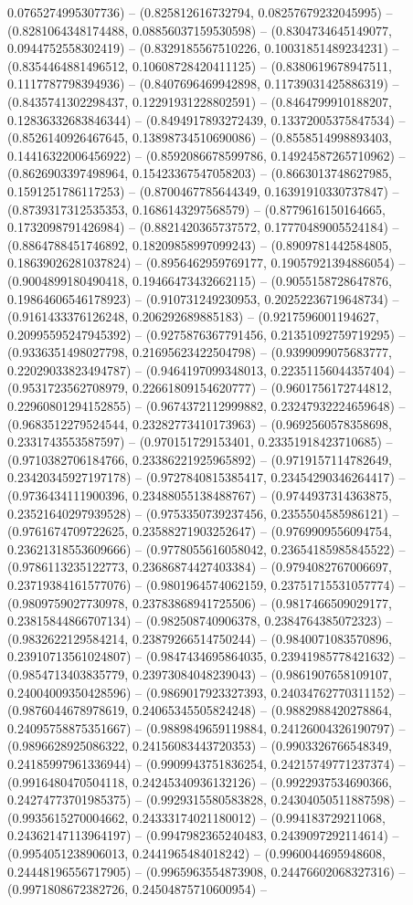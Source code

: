 0.0765274995307736) -- (0.825812616732794, 0.08257679232045995) -- (0.8281064348174488, 0.08856037159530598) -- (0.8304734645149077, 0.0944752558302419) -- (0.8329185567510226, 0.10031851489234231) -- (0.8354464881496512, 0.10608728420411125) -- (0.8380619678947511, 0.1117787798394936) -- (0.8407696469942898, 0.11739031425886319) -- (0.8435741302298437, 0.12291931228802591) -- (0.8464799910188207, 0.12836332683846344) -- (0.8494917893272439, 0.13372005375847534) -- (0.8526140926467645, 0.13898734510690086) -- (0.8558514998893403, 0.14416322006456922) -- (0.8592086678599786, 0.14924587265710962) -- (0.8626903397498964, 0.15423367547058203) -- (0.8663013748627985, 0.1591251786117253) -- (0.8700467785644349, 0.16391910330737847) -- (0.8739317312535353, 0.1686143297568579) -- (0.8779616150164665, 0.1732098791426984) -- (0.8821420365737572, 0.17770489005524184) -- (0.8864788451746892, 0.18209858997099243) -- (0.8909781442584805, 0.18639026281037824) -- (0.8956462959769177, 0.19057921394886054) -- (0.9004899180490418, 0.19466473432662115) -- (0.9055158728647876, 0.19864606546178923) -- (0.910731249230953, 0.20252236719648734) -- (0.9161433376126248, 0.206292689885183) -- (0.9217596001194627, 0.20995595247945392) -- (0.9275876367791456, 0.21351092759719295) -- (0.9336351498027798, 0.21695623422504798) -- (0.9399099075683777, 0.22029033823494787) -- (0.9464197099348013, 0.22351156044357404) -- (0.9531723562708979, 0.22661809154620777) -- (0.9601756172744812, 0.22960801294152855) -- (0.9674372112999882, 0.23247932224659648) -- (0.9683512279524544, 0.23282773410173963) -- (0.9692560578358698, 0.2331743553587597) -- (0.970151729153401, 0.23351918423710685) -- (0.9710382706184766, 0.23386221925965892) -- (0.9719157114782649, 0.23420345927197178) -- (0.9727840815385417, 0.23454290346264417) -- (0.9736434111900396, 0.23488055138488767) -- (0.9744937314363875, 0.23521640297939528) -- (0.9753350739237456, 0.2355504585986121) -- (0.9761674709722625, 0.23588271903252647) -- (0.9769909556094754, 0.23621318553609666) -- (0.9778055616058042, 0.23654185985845522) -- (0.9786113235122773, 0.23686874427403384) -- (0.9794082767006697, 0.23719384161577076) -- (0.9801964574062159, 0.23751715531057774) -- (0.9809759027730978, 0.23783868941725506) -- (0.9817466509029177, 0.23815844866707134) -- (0.982508740906378, 0.2384764385072323) -- (0.9832622129584214, 0.23879266514750244) -- (0.9840071083570896, 0.23910713561024807) -- (0.9847434695864035, 0.23941985778421632) -- (0.9854713403835779, 0.23973084048239043) -- (0.9861907658109107, 0.24004009350428596) -- (0.9869017923327393, 0.24034762770311152) -- (0.9876044678978619, 0.24065345505824248) -- (0.9882988420278864, 0.24095758875351667) -- (0.9889849659119884, 0.24126004326190797) -- (0.9896628925086322, 0.24156083443720353) -- (0.9903326766548349, 0.24185997961336944) -- (0.9909943751836254, 0.24215749771237374) -- (0.9916480470504118, 0.24245340936132126) -- (0.9922937534690366, 0.24274773701985375) -- (0.9929315580583828, 0.24304050511887598) -- (0.9935615270004662, 0.24333174021180012) -- (0.994183729211068, 0.24362147113964197) -- (0.9947982365240483, 0.2439097292114614) -- (0.9954051238906013, 0.2441965484018242) -- (0.9960044695948608, 0.24448196556717905) -- (0.9965963554873908, 0.24476602068327316) -- (0.9971808672382726, 0.24504875710600954) -- 